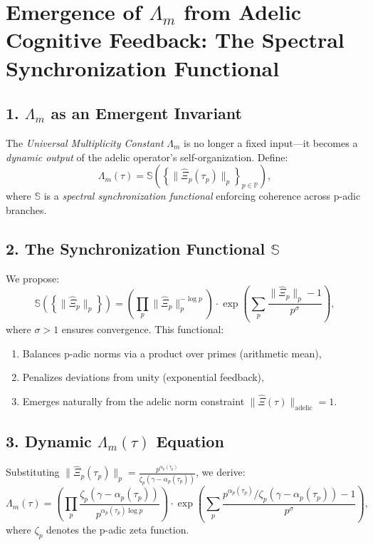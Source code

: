 \documentclass[12pt]{article}
\theoremstyle{plain}
\begin{document}
\section{Emergence of \(\Lambda_m\) from Adelic Cognitive Feedback: The Spectral Synchronization Functional}

\subsection*{1. \(\Lambda_m\) as an Emergent Invariant}

The \emph{Universal Multiplicity Constant} \( \Lambda_m \) is no longer a fixed input—it becomes a \emph{dynamic output} of the adelic operator’s self-organization. Define:
\[
\Lambda_m(\tau) = \mathbb{S}\left( \left\{ \| \hat{\Xi}_p(\tau_p) \|_p \right\}_{p \in \mathbb{P}} \right),
\]
where \( \mathbb{S} \) is a \emph{spectral synchronization functional} enforcing coherence across p-adic branches.

\subsection*{2. The Synchronization Functional \(\mathbb{S}\)}

We propose:
\[
\mathbb{S}\left( \left\{ \| \hat{\Xi}_p \|_p \right\} \right) = \left( \prod_p \| \hat{\Xi}_p \|_p^{-\log p} \right) \cdot \exp\left( \sum_p \frac{\| \hat{\Xi}_p \|_p - 1}{p^\sigma} \right),
\]
where \( \sigma > 1 \) ensures convergence. This functional:
\begin{enumerate}
    \item Balances p-adic norms via a product over primes (arithmetic mean),
    \item Penalizes deviations from unity (exponential feedback),
    \item Emerges naturally from the adelic norm constraint \( \| \hat{\Xi}(\tau) \|_{\text{adelic}} = 1 \).
\end{enumerate}

\subsection*{3. Dynamic \(\Lambda_m(\tau)\) Equation}

Substituting \( \| \hat{\Xi}_p(\tau_p) \|_p = \frac{p^{\alpha_p(\tau_p)}}{\zeta_p(\gamma - \alpha_p(\tau_p))} \), we derive:
\[
\Lambda_m(\tau) = \left( \prod_p \frac{\zeta_p(\gamma - \alpha_p(\tau_p))}{p^{\alpha_p(\tau_p) \log p}} \right) \cdot \exp\left( \sum_p \frac{p^{\alpha_p(\tau_p)} / \zeta_p(\gamma - \alpha_p(\tau_p)) - 1}{p^\sigma} \right),
\]
where \( \zeta_p \) denotes the p-adic zeta function.
\end{document}
